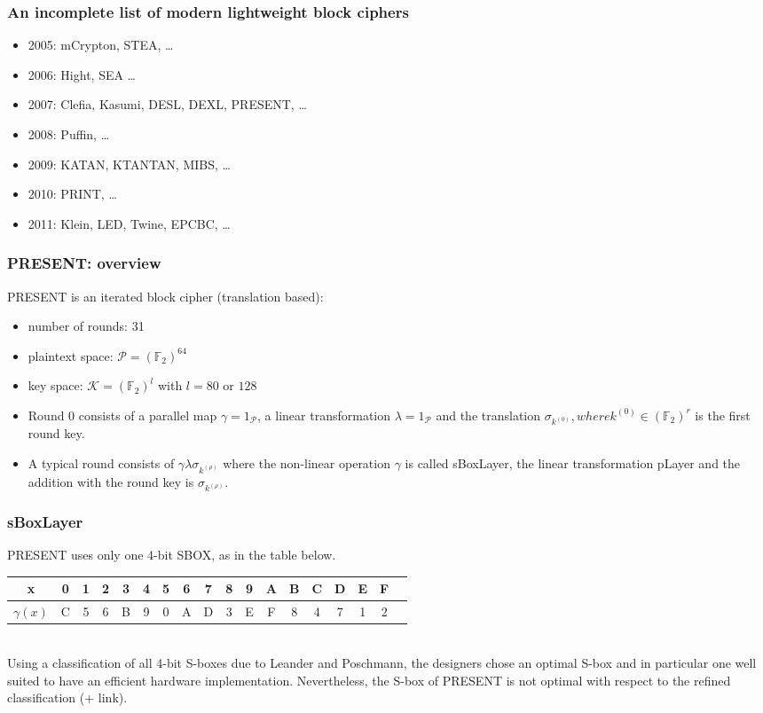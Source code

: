 \documentclass[a4paper, 10pt, titlepage]{article}
\begin{document}
\subsubsection*{An incomplete list of modern lightweight block ciphers}
\begin{itemize}
\item 2005: mCrypton, STEA, \dots
\item 2006: Hight, SEA \dots
\item 2007: Clefia, Kasumi, DESL, DEXL, PRESENT, \dots
\item 2008: Puffin, \dots
\item 2009: KATAN, KTANTAN, MIBS, \dots
\item 2010: PRINT, \dots
\item 2011: Klein, LED, Twine, EPCBC, \dots
\end{itemize}

\subsubsection*{PRESENT: overview}
PRESENT is an iterated block cipher (translation based):
\begin{itemize}
\item number of rounds: 31
\item plaintext space: $\mathcal{P} = (\mathbb{F}_2)^{64}$
\item key space: $\mathcal{K} = (\mathbb{F}_2)^l$ with $l = 80$ or $128$
\item Round 0 consists of a parallel map $\gamma = 1_{\mathcal{P}}$, a linear transformation $\lambda = 1_{\mathcal{P}}$ and the translation $\sigma_{k^{(0)}}, where k^{(0)} \in (\mathbb{F}_2)^r$ is the first round key.
\item A typical round consists of $\gamma \lambda \sigma_{k^{(\rho)}}$ where the non-linear operation $\gamma$ is called sBoxLayer, the linear transformation pLayer and the addition with the round key is $\sigma_{k^{(\rho)}}$.
\end{itemize}
\subsubsection*{sBoxLayer}
PRESENT uses only one 4-bit SBOX, as in the table below. \medskip \\
\begin{tabular}{|c||c|c|c|c|c|c|c|c|c|c|c|c|c|c|c|c|c|} \hline
x & 0 & 1& 2& 3& 4& 5& 6& 7& 8& 9& A& B& C& D& E& F \\ \hline
$\gamma(x)$ & C &5 &6 &B &9 &0 &A &D &3 &E &F &8 &4 &7 &1 &2 \\ \hline
\end{tabular} \medskip \\
Using a classification of all 4-bit S-boxes due to Leander and Poschmann, the designers chose an optimal S-box and in particular one well suited to have an efficient hardware implementation.
Nevertheless, the S-box of PRESENT is not optimal with respect to the refined classification (+ link).
\end{document}
